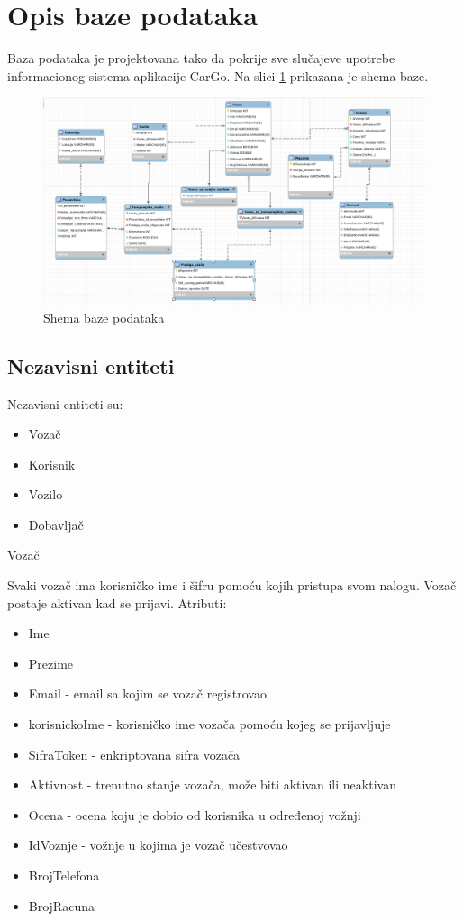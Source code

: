 \section{\bfseries Opis baze podataka}
Baza podataka je projektovana tako da pokrije sve slučajeve upotrebe informacionog sistema aplikacije CarGo. Na slici \ref{fig:bazaPodataka} prikazana je shema baze.

\begin{figure}[H]
\begin{center}
\includegraphics[width=\textwidth]{Slike/EERDijagramBazePodataka.png}
\end{center}
    \caption{Shema baze podataka}
\label{fig:bazaPodataka}
\end{figure}

\subsection{\textbf{Nezavisni entiteti}}Nezavisni entiteti su:
    \begin{itemize}
        \item Vozač
        \item Korisnik
        \item Vozilo
        \item Dobavljač
    \end{itemize}

\begin{flushleft}
\underline{Vozač}
\end{flushleft}
Svaki vozač ima korisničko ime i šifru pomoću kojih pristupa svom nalogu. Vozač postaje aktivan kad se prijavi. Atributi:
\begin{itemize}
    \item Ime
    \item Prezime
    \item Email - email sa kojim se vozač registrovao
    \item korisnickoIme - korisničko ime vozača pomoću kojeg se prijavljuje
    \item SifraToken - enkriptovana sifra vozača
    \item Aktivnost - trenutno stanje vozača, može biti aktivan ili neaktivan
    \item Ocena - ocena koju je dobio od korisnika u određenoj vožnji
    \item IdVoznje - vožnje u kojima je vozač učestvovao
    \item BrojTelefona
    \item BrojRacuna
\end{itemize}

